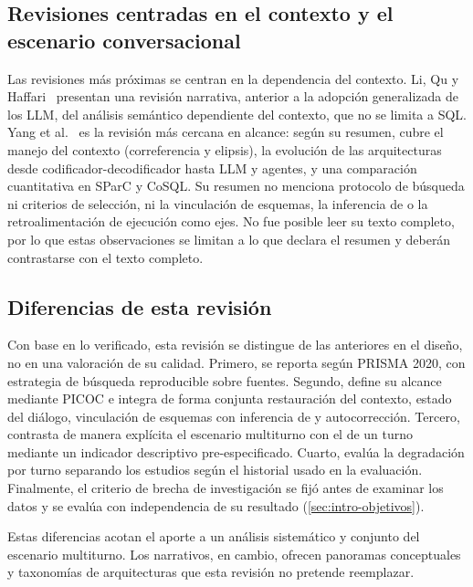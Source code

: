 \subsection{Revisiones centradas en el contexto y el escenario conversacional}
\label{sec:rel-conversacional}

Las revisiones más próximas se centran en la dependencia del contexto. Li, Qu y Haffari~\cite{Li2020ContextSurvey} presentan una revisión narrativa, anterior a la adopción generalizada de los LLM, del análisis semántico dependiente del contexto, que no se limita a SQL. Yang et al.~\cite{Yang2025Conversational} es la revisión más cercana en alcance: según su resumen, cubre el manejo del contexto (correferencia y elipsis), la evolución de las arquitecturas desde codificador-decodificador hasta LLM y agentes, y una comparación cuantitativa en SParC y CoSQL. Su resumen no menciona protocolo de búsqueda ni criterios de selección, ni la vinculación de esquemas, la inferencia de  o la retroalimentación de ejecución como ejes. No fue posible leer su texto completo, por lo que estas observaciones se limitan a lo que declara el resumen y deberán contrastarse con el texto completo.

\subsection{Diferencias de esta revisión}
\label{sec:rel-brecha}

Con base en lo verificado, esta revisión se distingue de las anteriores en el diseño, no en una valoración de su calidad. Primero, se reporta según PRISMA 2020, con estrategia de búsqueda reproducible sobre \nBases{} fuentes. Segundo, define su alcance mediante PICOC e integra de forma conjunta restauración del contexto, estado del diálogo, vinculación de esquemas con inferencia de  y autocorrección. Tercero, contrasta de manera explícita el escenario multiturno con el de un turno mediante un indicador descriptivo pre-especificado. Cuarto, evalúa la degradación por turno separando los estudios según el historial usado en la evaluación. Finalmente, el criterio de brecha de investigación se fijó antes de examinar los datos y se evalúa con independencia de su resultado (\cref{sec:intro-objetivos}).

Estas diferencias acotan el aporte a un análisis sistemático y conjunto del escenario multiturno. Los  narrativos, en cambio, ofrecen panoramas conceptuales y taxonomías de arquitecturas que esta revisión no pretende reemplazar.
